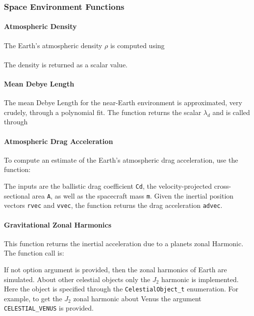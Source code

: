 \subsubsection{Space Environment Functions}
\paragraph{Atmospheric Density}
The Earth's atmospheric density $\rho$ is computed using\\
 \\
The density is returned as a scalar value.  

\paragraph{Mean Debye Length}
The mean Debye Length for the near-Earth environment is approximated, very crudely, through a polynomial fit.  The function returns the scalar $\lambda_{d}$ and is called through \\

\paragraph{Atmospheric Drag Acceleration}
To compute an estimate of  the Earth's atmospheric drag acceleration, use the function: \\

The inputs are the ballistic drag coefficient {\tt Cd}, the velocity-projected cross-sectional area {\tt A}, as well as the spacecraft mass {\tt m}.  Given the inertial position vectors {\tt rvec} and {\tt vvec}, the function returns the drag acceleration {\tt advec}.  

\paragraph{Gravitational Zonal Harmonics}
This function returns the inertial acceleration due to a planets zonal Harmonic.  The function call is:\\

If not option argument is provided, then the zonal harmonics of Earth are simulated.  About other celestial objects only the $J_{2}$ harmonic is implemented.  Here the object is specified through the {\tt CelestialObject\_t} enumeration.  For example, to get the $J_{2}$ zonal harmonic about Venus the argument {\tt CELESTIAL\_VENUS} is provided.  

